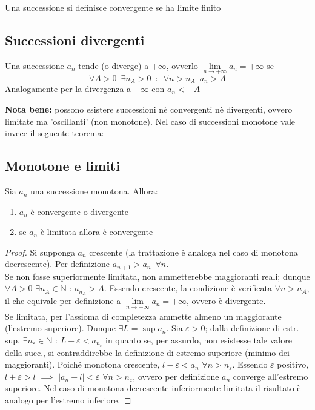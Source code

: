 \documentclass[10pt, oneside]{book}
\theoremstyle{plain}
\begin{document}
\begin{defin}
    Una successione si definisce convergente se ha limite finito
\end{defin}

\subsection{Successioni divergenti}
\begin{defin}
    Una successione $a_n$ tende (o diverge) a $+\infty$, ovverlo $\lim \limits_{n \rightarrow +\infty} a_n = + \infty$ se 
    \[\forall A > 0 \enspace \exists n_A > 0 \enspace : \enspace \forall n> n_A \enspace a_n > A\]
    Analogamente per la divergenza a $-\infty$ con $a_n < -A$
\end{defin}
\textbf{Nota bene: } possono esistere successioni nè convergenti nè divergenti, ovvero limitate ma 'oscillanti' (non monotone). Nel caso di successioni monotone vale invece il seguente teorema:

\subsection{Monotone e limiti}
\begin{ther}
    Sia $a_n$ una successione monotona. Allora:
    \begin{enumerate}
        \item $a_n$ è convergente o divergente
        \item se $a_n$ è limitata allora è convergente
    \end{enumerate}
\end{ther}
\begin{proof}
    Si supponga $a_n$ crescente (la trattazione è analoga nel caso di monotona decrescente). Per definizione $a_{n+1} > a_n \enspace \forall n$. 
    \\Se non fosse superiormente limitata, non ammetterebbe maggioranti reali; dunque $\forall A > 0$ $\exists n_A \in \mathbb{N}$ : $a_{n_A} > A$. Essendo crescente, la condizione è verificata $\forall n > n_A$, il che equivale per definizione a $\lim \limits_{n \rightarrow +\infty} a_n = +\infty$, ovvero è divergente.
    \\Se limitata, per l'assioma di completezza ammette almeno un maggiorante (l'estremo superiore). Dunque $\exists L = \sup a_n$. Sia $\varepsilon > 0$; dalla definizione di estr. sup. $\exists n_\varepsilon \in \mathbb{N}$ : $L - \varepsilon < a_{n_\varepsilon}$ in quanto se, per assurdo, non esistesse tale valore della succ., si contraddirebbe la definizione di estremo superiore (minimo dei maggioranti). Poiché monotona crescente, $l - \varepsilon < a_n$ $\forall n > n_\varepsilon$. Essendo $\varepsilon$ positivo, $l + \varepsilon > l$ $\implies$ $|a_n - l| < \varepsilon$ $\forall n > n_\varepsilon$, ovvero per definizione $a_n$ converge all'estremo superiore. Nel caso di monotona decrescente inferiormente limitata il risultato è analogo per l'estremo inferiore.
\end{proof}
\end{document}
